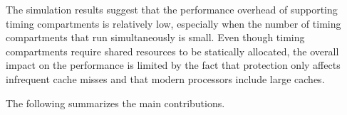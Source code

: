 

The simulation results suggest that the performance overhead of supporting
timing compartments is relatively low, especially when the number of timing
compartments that run simultaneously is small.
Even though
timing compartments require shared resources to be statically 
allocated, the overall impact on the performance is limited by the fact
that protection only affects infrequent cache misses and that modern
processors include large caches. 

The following summarizes the main contributions.

